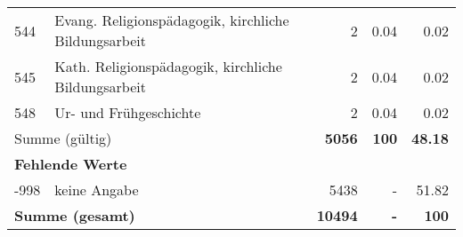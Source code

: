 \begin{longtable}{lXrrr}
        544 & \multicolumn{1}{X}{Evang. Religionspädagogik, kirchliche Bildungsarbeit} & %
          \num{2} &
          \num[round-mode=places,round-precision=2]{0,04} &
          \num[round-mode=places,round-precision=2]{0,02} \\

        545 & \multicolumn{1}{X}{Kath. Religionspädagogik, kirchliche Bildungsarbeit} & %
          \num{2} &
          \num[round-mode=places,round-precision=2]{0,04} &
          \num[round-mode=places,round-precision=2]{0,02} \\

        548 & \multicolumn{1}{X}{Ur- und Frühgeschichte} & %
          \num{2} &
          \num[round-mode=places,round-precision=2]{0,04} &
          \num[round-mode=places,round-precision=2]{0,02} \\

     \midrule
     \multicolumn{2}{l}{Summe (gültig)} &
       \textbf{\num{5056}} &
     \textbf{100} &
       \textbf{\num[round-mode=places,round-precision=2]{48,18}} \\
     \multicolumn{5}{l}{\textbf{Fehlende Werte}}\\
       -998 &
       keine Angabe &
         \num{5438} &
        - &
         \num[round-mode=places,round-precision=2]{51,82} \\
     \midrule
     \multicolumn{2}{l}{\textbf{Summe (gesamt)}} &
          \textbf{\num{10494}} &
        \textbf{-} &
        \textbf{100} \\
     \bottomrule
     \end{longtable}
     
